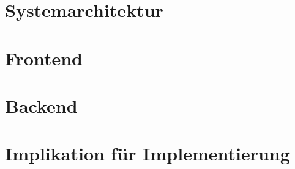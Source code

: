 \section{Systemarchitektur}




\section{Frontend}




\section{Backend}




\section{Implikation für Implementierung}

